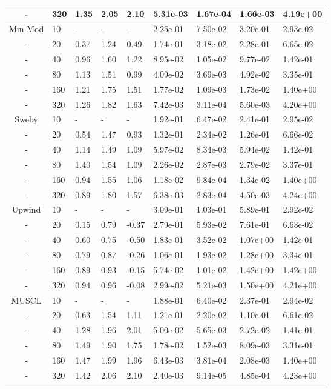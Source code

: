 \begin{table}[p]
{\begin{tabular}{cllllllll}
     - & 320 & 1.35 & 2.05 & 2.10 & 5.31e-03 & 1.67e-04 & 1.66e-03 & 4.19e+00 \\ 
   \hline
        Min-Mod &  10 & - & - & - & 2.25e-01 & 7.50e-02 & 3.20e-01 & 2.93e-02 \\ 
        - &  20 & 0.37 & 1.24 & 0.49 & 1.74e-01 & 3.18e-02 & 2.28e-01 & 6.65e-02 \\ 
        - &  40 & 0.96 & 1.60 & 1.22 & 8.95e-02 & 1.05e-02 & 9.77e-02 & 1.42e-01 \\ 
        - &  80 & 1.13 & 1.51 & 0.99 & 4.09e-02 & 3.69e-03 & 4.92e-02 & 3.35e-01 \\ 
        - & 160 & 1.21 & 1.75 & 1.51 & 1.77e-02 & 1.09e-03 & 1.73e-02 & 1.40e+00 \\ 
        - & 320 & 1.26 & 1.82 & 1.63 & 7.42e-03 & 3.11e-04 & 5.60e-03 & 4.20e+00 \\ 
   \hline
          Sweby &  10 & - & - & - & 1.92e-01 & 6.47e-02 & 2.41e-01 & 2.95e-02 \\ 
          - &  20 & 0.54 & 1.47 & 0.93 & 1.32e-01 & 2.34e-02 & 1.26e-01 & 6.66e-02 \\ 
          - &  40 & 1.14 & 1.49 & 1.09 & 5.97e-02 & 8.34e-03 & 5.94e-02 & 1.42e-01 \\ 
          - &  80 & 1.40 & 1.54 & 1.09 & 2.26e-02 & 2.87e-03 & 2.79e-02 & 3.37e-01 \\ 
          - & 160 & 0.94 & 1.55 & 1.06 & 1.18e-02 & 9.84e-04 & 1.34e-02 & 1.40e+00 \\ 
          - & 320 & 0.89 & 1.80 & 1.57 & 6.38e-03 & 2.83e-04 & 4.50e-03 & 4.24e+00 \\ 
   \hline
         Upwind &  10 & - & - & - & 3.09e-01 & 1.03e-01 & 5.89e-01 & 2.92e-02 \\ 
         - &  20 & 0.15 & 0.79 & -0.37& 2.79e-01 & 5.93e-02 & 7.61e-01 & 6.63e-02 \\ 
         - &  40 & 0.60 & 0.75 & -0.50& 1.83e-01 & 3.52e-02 & 1.07e+00 & 1.42e-01 \\ 
         - &  80 & 0.79 & 0.87 & -0.26& 1.06e-01 & 1.93e-02 & 1.28e+00 & 3.34e-01 \\ 
         - & 160 & 0.89 & 0.93 & -0.15& 5.74e-02 & 1.01e-02 & 1.42e+00 & 1.42e+00 \\ 
         - & 320 & 0.94 & 0.96 & -0.08& 2.99e-02 & 5.21e-03 & 1.50e+00 & 4.21e+00 \\ 
   \hline
          MUSCL &  10 & - & - & - & 1.88e-01 & 6.40e-02 & 2.37e-01 & 2.94e-02 \\ 
          - &  20 & 0.63 & 1.54 & 1.11 & 1.21e-01 & 2.20e-02 & 1.10e-01 & 6.61e-02 \\ 
          - &  40 & 1.28 & 1.96 & 2.01 & 5.00e-02 & 5.65e-03 & 2.72e-02 & 1.41e-01 \\ 
          - &  80 & 1.49 & 1.90 & 1.75 & 1.78e-02 & 1.52e-03 & 8.09e-03 & 3.31e-01 \\ 
          - & 160 & 1.47 & 1.99 & 1.96 & 6.43e-03 & 3.81e-04 & 2.08e-03 & 1.40e+00 \\ 
          - & 320 & 1.42 & 2.06 & 2.10 & 2.40e-03 & 9.14e-05 & 4.85e-04 & 4.23e+00 \\
   \hline
   \end{tabular}
   }
\end{table}